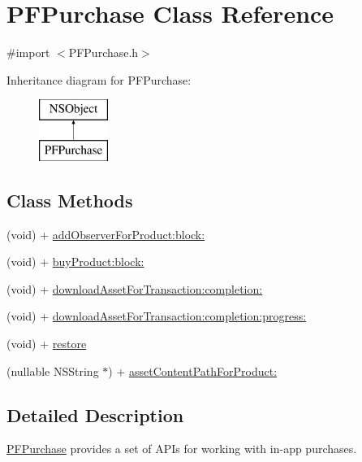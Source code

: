 \hypertarget{interface_p_f_purchase}{}\section{P\+F\+Purchase Class Reference}
\label{interface_p_f_purchase}


{\ttfamily \#import $<$P\+F\+Purchase.\+h$>$}

Inheritance diagram for P\+F\+Purchase\+:\begin{figure}[H]
\begin{center}
\leavevmode
\includegraphics[height=2.000000cm]{interface_p_f_purchase}
\end{center}
\end{figure}
\subsection*{Class Methods}
\begin{DoxyCompactItemize}
\item 
(void) + \hyperlink{interface_p_f_purchase_a2cb3522db618e847d2f923e3a8329e9d}{add\+Observer\+For\+Product\+:block\+:}
\item 
(void) + \hyperlink{interface_p_f_purchase_a71aa51fdfc6d35d074d27c68462a9018}{buy\+Product\+:block\+:}
\item 
(void) + \hyperlink{interface_p_f_purchase_aa15d930ab2ec4febd370a3a82d608836}{download\+Asset\+For\+Transaction\+:completion\+:}
\item 
(void) + \hyperlink{interface_p_f_purchase_af91a909a3e08d699f9a7ce67de23259a}{download\+Asset\+For\+Transaction\+:completion\+:progress\+:}
\item 
(void) + \hyperlink{interface_p_f_purchase_a0fed56fd4a6d42ef9dd0e922a2c8a64f}{restore}
\item 
(nullable N\+S\+String $\ast$) + \hyperlink{interface_p_f_purchase_af6370ba8f84b4141f9ff7fa9f24f2fb1}{asset\+Content\+Path\+For\+Product\+:}
\end{DoxyCompactItemize}


\subsection{Detailed Description}
{\ttfamily \hyperlink{interface_p_f_purchase}{P\+F\+Purchase}} provides a set of A\+P\+Is for working with in-\/app purchases.

